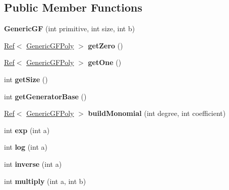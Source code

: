 \subsection*{Public Member Functions}
\begin{DoxyCompactItemize}
\item 
\mbox{\label{classzxing_1_1_generic_g_f_aea2ca4be0b1fbda1905ac530777aef05}} 
{\bfseries Generic\+GF} (int primitive, int size, int b)
\item 
\mbox{\label{classzxing_1_1_generic_g_f_a07e18aecb8935f907e46176b3840fe3e}} 
\mbox{\hyperlink{classzxing_1_1_ref}{Ref}}$<$ \mbox{\hyperlink{classzxing_1_1_generic_g_f_poly}{Generic\+G\+F\+Poly}} $>$ {\bfseries get\+Zero} ()
\item 
\mbox{\label{classzxing_1_1_generic_g_f_a2a196e1da86283c7ed66ed233d99a819}} 
\mbox{\hyperlink{classzxing_1_1_ref}{Ref}}$<$ \mbox{\hyperlink{classzxing_1_1_generic_g_f_poly}{Generic\+G\+F\+Poly}} $>$ {\bfseries get\+One} ()
\item 
\mbox{\label{classzxing_1_1_generic_g_f_a1ad2851a60e1cae7d13ac8008c4f979d}} 
int {\bfseries get\+Size} ()
\item 
\mbox{\label{classzxing_1_1_generic_g_f_a6142c6836cdf7bab5914a285c4150a03}} 
int {\bfseries get\+Generator\+Base} ()
\item 
\mbox{\label{classzxing_1_1_generic_g_f_aa37ced4c53c94f1ae23d85dd2cfc5a51}} 
\mbox{\hyperlink{classzxing_1_1_ref}{Ref}}$<$ \mbox{\hyperlink{classzxing_1_1_generic_g_f_poly}{Generic\+G\+F\+Poly}} $>$ {\bfseries build\+Monomial} (int degree, int coefficient)
\item 
\mbox{\label{classzxing_1_1_generic_g_f_a3431d80512185412f3fab7742249a981}} 
int {\bfseries exp} (int a)
\item 
\mbox{\label{classzxing_1_1_generic_g_f_affa7356b88c98ed342feb3e444bff3c7}} 
int {\bfseries log} (int a)
\item 
\mbox{\label{classzxing_1_1_generic_g_f_aaa8f1980f85198fe1307696ecfd9d7d4}} 
int {\bfseries inverse} (int a)
\item 
\mbox{\label{classzxing_1_1_generic_g_f_a29dea370d28768f32dec76e409b55429}} 
int {\bfseries multiply} (int a, int b)
\end{DoxyCompactItemize}
